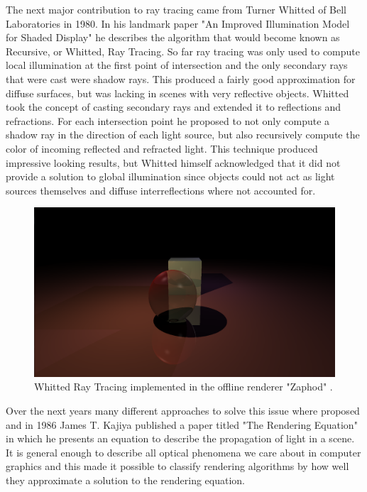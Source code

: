 \documentclass{ACGSeminar}
\begin{document}
The next major contribution to ray tracing came from Turner Whitted of Bell Laboratories in 1980. In his landmark paper "An Improved Illumination Model for Shaded Display" \cite{Whitted:1980} he describes the algorithm that would become known as Recursive, or Whitted, Ray Tracing. So far ray tracing was only used to compute local illumination at the first point of intersection and the only secondary rays that were cast were shadow rays. This produced a fairly good approximation for diffuse surfaces, but was lacking in scenes with very reflective objects. Whitted took the concept of casting secondary rays and extended it to reflections and refractions. For each intersection point he proposed to not only compute a shadow ray in the direction of each light source, but also recursively compute the color of incoming reflected and refracted light. This technique produced impressive looking results, but Whitted himself acknowledged that it did not provide a solution to global illumination since objects could not act as light sources themselves and diffuse interreflections where not accounted for.

\begin{figure}[htb!]
  \begin{centering}
    \includegraphics[width=12cm]{figures/whitted_raytracing.png}\par
  \end{centering}
  \caption{Whitted Ray Tracing implemented in the offline renderer "Zaphod" \cite{Zaphod}.}
  \label{fig:whitted-example}
\end{figure}


Over the next years many different approaches to solve this issue where proposed and in 1986 James T. Kajiya published a paper titled "The Rendering Equation"  \cite{Kajiya:1986} in which he presents an equation to describe the propagation of light in a scene. It is general enough to describe all optical phenomena we care about in computer graphics and this made it possible to classify rendering algorithms by how well they approximate a solution to the rendering equation.
\end{document}
